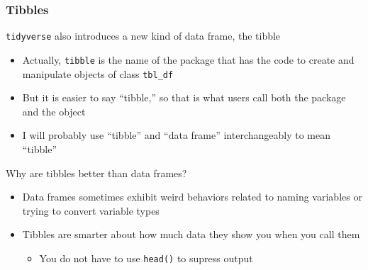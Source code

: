 \documentclass{beamer}\usepackage[]{graphicx}\usepackage[]{xcolor}
\begin{document}
\begin{frame}\frametitle{Tibbles}
    \texttt{tidyverse} also introduces a new kind of data frame, the tibble
    \begin{itemize}
        \item Actually, \texttt{tibble} is the name of the package that has the code to create and manipulate objects of class \texttt{tbl\_df}
        \item But it is easier to say ``tibble,'' so that is what users call both the package and the object
        \item I will probably use ``tibble'' and  ``data frame'' interchangeably to mean ``tibble''
    \end{itemize}
    \vspace{2ex}
    Why are tibbles better than data frames?
    \begin{itemize}
        \item Data frames sometimes exhibit weird behaviors related to naming variables or trying to convert variable types
        \item Tibbles are smarter about how much data they show you when you call them
        \begin{itemize}
            \item You do not have to use \texttt{head()} to supress output
        \end{itemize}
    \end{itemize}
\end{frame}
\end{document}
